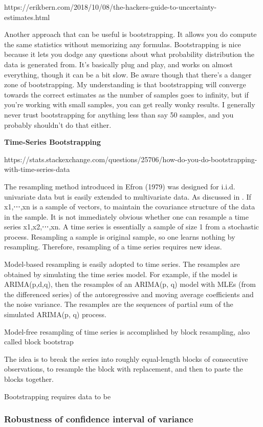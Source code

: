 \documentclass[11pt]{article}
\begin{document}
https://erikbern.com/2018/10/08/the-hackers-guide-to-uncertainty-estimates.html

Another approach that can be useful is bootstrapping. It allows you do
compute the same statistics without memorizing any formulas.
Bootstrapping is nice because it lets you dodge any questions about what
probability distribution the data is generated from. It's basically plug
and play, and works on almost everything, though it can be a bit slow.
Be aware though that there's a danger zone of bootstrapping. My
understanding is that bootstrapping will converge towards the correct
estimates as the number of samples goes to infinity, but if you're
working with small samples, you can get really wonky results. I
generally never trust bootstrapping for anything less than say 50
samples, and you probably shouldn't do that either.

\textbf{Time-Series Bootstrapping}

https://stats.stackexchange.com/questions/25706/how-do-you-do-bootstrapping-with-time-series-data

The resampling method introduced in Efron (1979) was designed for i.i.d.
univariate data but is easily extended to multivariate data. As
discussed in . If x1,⋅⋅⋅,xn is a sample of vectors, to maintain the
covariance structure of the data in the sample. It is not immediately
obvious whether one can resample a time series x1,x2,⋅⋅⋅,xn. A time
series is essentially a sample of size 1 from a stochastic process.
Resampling a sample is original sample, so one learns nothing by
resampling. Therefore, resampling of a time series requires new ideas.

Model-based resampling is easily adopted to time series. The resamples
are obtained by simulating the time series model. For example, if the
model is ARIMA(p,d,q), then the resamples of an ARIMA(p, q) model with
MLEs (from the differenced series) of the autoregressive and moving
average coefficients and the noise variance. The resamples are the
sequences of partial sum of the simulated ARIMA(p, q) process.

Model-free resampling of time series is accomplished by block
resampling, also called block bootstrap

The idea is to break the series into roughly equal-length blocks of
consecutive observations, to resample the block with replacement, and
then to paste the blocks together.

Bootstrapping requires data to be

    \subsubsection{Robustness of confidence interval of
variance}\label{robustness-of-confidence-interval-of-variance}
\end{document}
